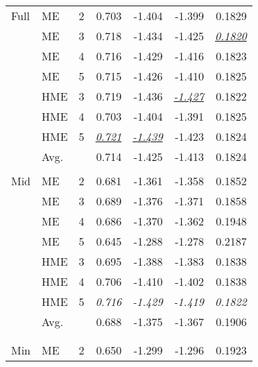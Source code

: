 \documentclass[12pt]{article}
\newcommand{\iu}[1]{\underline{\textit{#1}}}
\theoremstyle{definition}
\begin{document}
\begin{table}[b!]
\begin{threeparttable}
{\begin{tabular}[r]{l l l r r r r}
Full     &  ME   &    2    & 0.703      & -1.404      & -1.399      & 0.1829      \\
         &  ME   &    3    & 0.718      & -1.434      & -1.425      & \iu{0.1820} \\
         &  ME   &    4    & 0.716      & -1.429      & -1.416      & 0.1823      \\
         &  ME   &    5    & 0.715      & -1.426      & -1.410      & 0.1825      \\
         &  HME  &    3    & 0.719      & -1.436      & \iu{-1.427} & 0.1822      \\
         &  HME  &    4    & 0.703      & -1.404      & -1.391      & 0.1825      \\
         &  HME  &    5    & \iu{0.721} & \iu{-1.439} & -1.423      & 0.1824      \\
         \cmidrule(l){2-7}
         &  Avg. &         & 0.714      & -1.425      & -1.413      & 0.1824      \\
         \cmidrule(l){2-7}
         &       &         &            &             &             &             \\
Mid      &  ME   &    2    & 0.681      & -1.361      & -1.358      & 0.1852      \\
         &  ME   &    3    & 0.689      & -1.376      & -1.371      & 0.1858      \\
         &  ME   &    4    & 0.686      & -1.370      & -1.362      & 0.1948      \\
         &  ME   &    5    & 0.645      & -1.288      & -1.278      & 0.2187      \\
         &  HME  &    3    & 0.695      & -1.388      & -1.383      & 0.1838      \\
         &  HME  &    4    & 0.706      & -1.410      & -1.402      & 0.1838      \\
         &  HME  &    5    & \it{0.716} & \it{-1.429} & \it{-1.419} & \it{0.1822} \\
         \cmidrule(l){2-7}
         &  Avg. &         & 0.688      & -1.375      & -1.367      & 0.1906      \\
         \cmidrule(l){2-7}
         &       &         &            &             &             &             \\
         &       &         &            &             &             &             \\
Min      &  ME   &    2    & 0.650      & -1.299      & -1.296      & 0.1923      \\

\end{tabular}}
\end{threeparttable}
\end{table}
\end{document}
